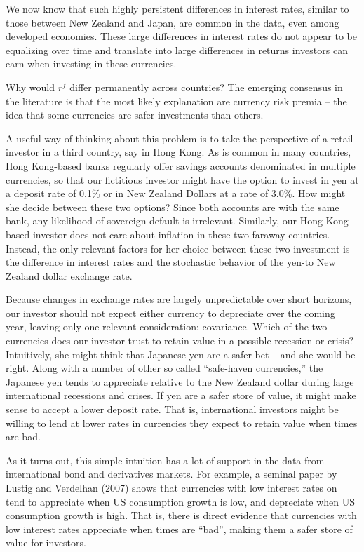 \documentclass[12pt,letter]{article}
\theoremstyle{break} \theorembodyfont{\normalfont\itshape}
\theoremstyle{break}
\theoremstyle{break} \theorembodyfont{\normalfont\itshape}
\theoremstyle{break} \theorembodyfont{\normalfont\itshape}
\begin{document}
We now know that such highly persistent differences in interest rates,
similar to those between New Zealand and Japan, are common in the
data, even among developed economies. These large differences in
interest rates do not appear to be equalizing over
time and translate into large differences in returns investors can
earn when investing in these currencies.

Why would $r^f$ differ permanently across countries? The emerging
consensus in the literature is that the most likely explanation are
currency risk premia -- the idea that some currencies are safer
investments than others. 

A useful way of thinking about this problem
is to take the perspective of a retail investor in a third country, say in Hong Kong.
As is common in many countries, Hong Kong-based banks regularly offer savings accounts denominated in multiple currencies, so that our fictitious investor might have the option to invest in yen at a deposit rate of 0.1\% or in New Zealand Dollars at a rate of 3.0\%. How might she decide between these two options? Since both accounts are with the same bank, any likelihood of sovereign default is irrelevant. Similarly, our Hong-Kong based investor does not care about inflation in these two faraway countries. Instead, the only relevant factors for her choice between these two investment is the difference in interest rates and the stochastic behavior of the yen-to New Zealand dollar exchange rate. 

Because changes in exchange rates are largely unpredictable over short horizons, our investor should not expect either currency to depreciate over the coming year, leaving only one relevant consideration: covariance. Which of the two currencies does our investor trust to retain value in a possible recession or crisis? Intuitively, she might think that Japanese yen are a safer bet -- and she would be right. Along with a number of other so called ``safe-haven currencies,'' the Japanese yen tends to appreciate relative to the New Zealand dollar during large international recessions and crises. If yen are a safer store of value, it might make sense to accept a lower deposit rate. That is, international investors might be willing to lend at lower rates in currencies they expect to retain value when times are bad. 

As it turns out, this simple intuition has a lot of support in the
data from international bond and derivatives markets. For example, a seminal paper by Lustig and Verdelhan (2007)
shows that currencies with low interest rates on tend to appreciate
when US consumption growth is low, and depreciate when US consumption
growth is high. That is, there is direct evidence that currencies with
low interest rates appreciate when times are ``bad'', making them a
safer store of value for investors.
\end{document}
